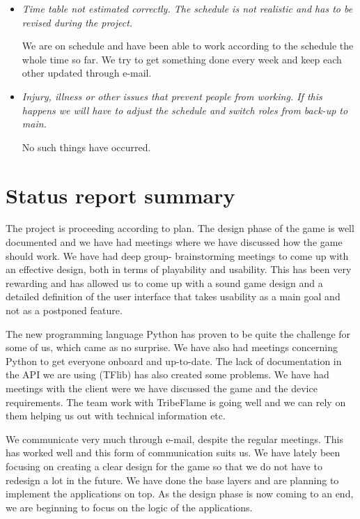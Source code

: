 \documentclass[12pt,a4paper]{article}
\begin{document}
\begin{itemize}
\item \textit{Time table not estimated correctly. The schedule is not realistic and has to be revised during the project.}

We are on schedule and have been able to work according to the schedule the whole time so far. We try to get something done every week and keep each other updated through e-mail.

\item \textit{Injury, illness or other issues that prevent people from working. If this happens we will have to adjust the schedule and switch roles from back-up to main.}

No such things have occurred.
\end{itemize}

\section{Status report summary}

The project is proceeding according to plan. The design phase of the game is well documented and we have had meetings where we have discussed how the game should work. We have had deep group- brainstorming meetings to come up with an effective design, both in terms of playability and usability. This has been very rewarding and has allowed us to come up with a sound game design and a detailed definition of the user interface that takes usability as a main goal and not as a postponed feature.

The new programming language Python has proven to be quite the challenge for some of us, which came as no surprise. We have also had meetings concerning Python to get everyone onboard and up-to-date. The lack of documentation in the API we are using (TFlib) has also created some problems. We have had meetings with the client were we have discussed the game and the device requirements. The team work with TribeFlame is going well and we can rely on them helping us out with technical information etc.

We communicate very much through e-mail, despite the regular meetings. This has worked well and this form of communication suits us. We have lately been focusing on creating a clear design for the game so that we do not have to redesign a lot in the future. We have done the base layers and are planning to implement the applications on top. As the design phase is now coming to an end, we are beginning to focus on the logic of the applications.
\end{document}
